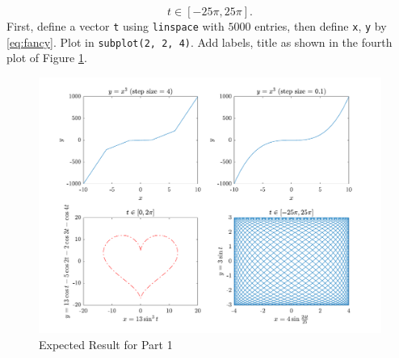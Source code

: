 \begin{enumerate}[(a)]
\begin{equation}
        t \in [-25 \pi, 25\pi].
        \end{equation}
        First, define a vector \verb|t| using \verb|linspace| with $5000$ entries, then define \verb|x|, \verb|y| by \eqref{eq:fancy}. Plot in \verb|subplot(2, 2, 4)|. Add labels, title as shown in the fourth plot of Figure \ref{fig:1}.
\begin{figure}[!hbtp]
    \centering
    \includegraphics[height=0.27\textheight]{./fig/lab_04_plot_1.pdf}
    \caption{Expected Result for Part 1}
    \label{fig:1}
\end{figure}
\end{enumerate}
